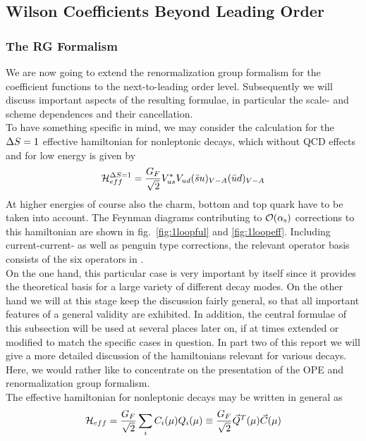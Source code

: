\subsection{Wilson Coefficients Beyond Leading Order}
            \label{sec:basicform:wc}
\subsubsection{The RG Formalism}
               \label{sec:basicform:wc:rgf}
We are now going to extend the renormalization group formalism for
the coefficient functions to the next-to-leading order level.
Subsequently we will discuss important aspects of the resulting
formulae, in particular the scale- and scheme dependences and their
cancellation.\\
To have something specific in mind, we may consider the calculation
for the $\Delta S=1$ effective hamiltonian for nonleptonic decays, which
without QCD effects and for low energy is given by
\begin{equation}\label{hds1}
{\cal H}^{\Delta S=1}_{eff}={G_F\over\sqrt{2}}V^\ast_{us}V_{ud}
  (\bar su)_{V-A}(\bar ud)_{V-A}   \end{equation}
At higher energies of course also the charm, bottom and top quark
have to be taken into account. The Feynman diagrams contributing to
${\cal O}(\alpha_{\rm s})$ corrections to this hamiltonian are shown in
fig.~\ref{fig:1loopful} and \ref{fig:1loopeff}.
Including current-current- as well as penguin type corrections, the
relevant operator basis consists of the six operators in .
\\
On the one hand, this particular case is very important by itself since
it provides the theoretical basis for a large variety of different
decay modes. On the other hand we will at this stage keep the
discussion fairly general, so that all important features of a general
validity are exhibited. In addition, the central formulae of this
subsection will be used at several places later on, if at times
extended or modified to match the specific cases in question. In
part two of this report we will give a more detailed discussion of
the hamiltonians relevant for various decays. Here, we would rather like
to concentrate on the presentation of the OPE and renormalization group
formalism.
\\
The effective hamiltonian for nonleptonic decays may be written in
general as
\begin{equation}\label{hqtc}
{\cal H}_{eff}={G_F\over\sqrt{2}}\sum_i C_i(\mu)Q_i(\mu)\equiv
  {G_F\over\sqrt{2}}\vec Q^T(\mu) \vec C(\mu)   \end{equation}
